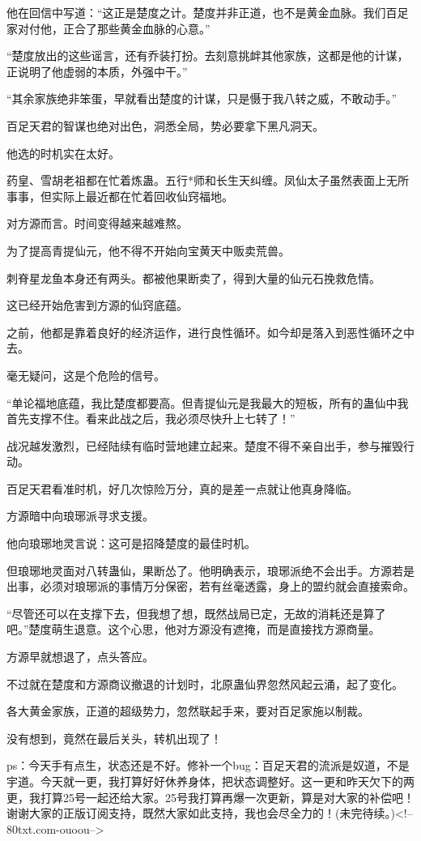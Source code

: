 \begin{this_body}
他在回信中写道：“这正是楚度之计。楚度并非正道，也不是黄金血脉。我们百足家对付他，正合了那些黄金血脉的心意。”

“楚度放出的这些谣言，还有乔装打扮。去刻意挑衅其他家族，这都是他的计谋，正说明了他虚弱的本质，外强中干。”

“其余家族绝非笨蛋，早就看出楚度的计谋，只是慑于我八转之威，不敢动手。”

百足天君的智谋也绝对出色，洞悉全局，势必要拿下黑凡洞天。

他选的时机实在太好。

药皇、雪胡老祖都在忙着炼蛊。五行*师和长生天纠缠。凤仙太子虽然表面上无所事事，但实际上最近都在忙着回收仙窍福地。

对方源而言。时间变得越来越难熬。

为了提高青提仙元，他不得不开始向宝黄天中贩卖荒兽。

刺脊星龙鱼本身还有两头。都被他果断卖了，得到大量的仙元石挽救危情。

这已经开始危害到方源的仙窍底蕴。

之前，他都是靠着良好的经济运作，进行良性循环。如今却是落入到恶性循环之中去。

毫无疑问，这是个危险的信号。

“单论福地底蕴，我比楚度都要高。但青提仙元是我最大的短板，所有的蛊仙中我首先支撑不住。看来此战之后，我必须尽快升上七转了！”

战况越发激烈，已经陆续有临时营地建立起来。楚度不得不亲自出手，参与摧毁行动。

百足天君看准时机，好几次惊险万分，真的是差一点就让他真身降临。

方源暗中向琅琊派寻求支援。

他向琅琊地灵言说：这可是招降楚度的最佳时机。

但琅琊地灵面对八转蛊仙，果断怂了。他明确表示，琅琊派绝不会出手。方源若是出事，必须对琅琊派的事情万分保密，若有丝毫透露，身上的盟约就会直接索命。

“尽管还可以在支撑下去，但我想了想，既然战局已定，无故的消耗还是算了吧。”楚度萌生退意。这个心思，他对方源没有遮掩，而是直接找方源商量。

方源早就想退了，点头答应。

不过就在楚度和方源商议撤退的计划时，北原蛊仙界忽然风起云涌，起了变化。

各大黄金家族，正道的超级势力，忽然联起手来，要对百足家施以制裁。

没有想到，竟然在最后关头，转机出现了！

ps：今天手有点生，状态还是不好。修补一个bug：百足天君的流派是奴道，不是宇道。今天就一更，我打算好好休养身体，把状态调整好。这一更和昨天欠下的两更，我打算25号一起还给大家。25号我打算再爆一次更新，算是对大家的补偿吧！谢谢大家的正版订阅支持，既然大家如此支持，我也会尽全力的！(未完待续。)<!--80txt.com-ouoou-->

\end{this_body}

